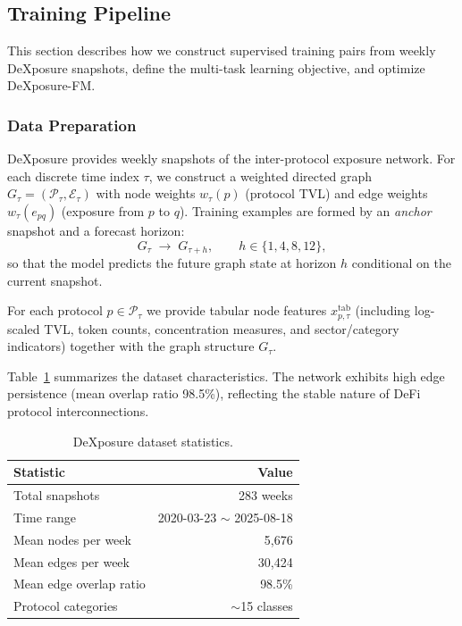 \subsection{Training Pipeline}\label{subsec:training-pipeline}

This section describes how we construct supervised training pairs from weekly DeXposure snapshots, define the multi-task learning objective, and optimize DeXposure-FM.

\subsubsection{Data Preparation}\label{subsubsec:data-prep}
DeXposure provides weekly snapshots of the inter-protocol exposure network. For each discrete time index $\tau$, we construct a weighted directed graph
$G_{\tau}=(\mathcal{P}_{\tau},\mathcal{E}_{\tau})$ with node weights $w_{\tau}(p)$ (protocol TVL) and edge weights $w_{\tau}(e_{pq})$ (exposure from $p$ to $q$).
Training examples are formed by an \emph{anchor} snapshot and a forecast horizon:
\begin{equation}
G_{\tau} \;\longrightarrow\; G_{\tau+h},
\qquad
h\in\{1,4,8,12\},
\label{eq:train-pairs}
\end{equation}
so that the model predicts the future graph state at horizon $h$ conditional on the current snapshot.

For each protocol $p\in\mathcal{P}_{\tau}$ we provide tabular node features $x^{\text{tab}}_{p,\tau}$ (including log-scaled TVL, token counts, concentration measures, and sector/category indicators) together with the graph structure $G_{\tau}$.

Table~\ref{tab:data-stats} summarizes the dataset characteristics. The network exhibits high edge persistence (mean overlap ratio 98.5\%), reflecting the stable nature of DeFi protocol interconnections.

\begin{table}[t]
\centering
\small
\begin{tabular}{lr}
\hline
\textbf{Statistic} & \textbf{Value} \\
\hline
Total snapshots & 283 weeks \\
Time range & 2020-03-23 $\sim$ 2025-08-18 \\
Mean nodes per week & 5,676 \\
Mean edges per week & 30,424 \\
Mean edge overlap ratio & 98.5\% \\
Protocol categories & $\sim$15 classes \\
\hline
\end{tabular}
\caption{DeXposure dataset statistics.}
\label{tab:data-stats}
\end{table}

